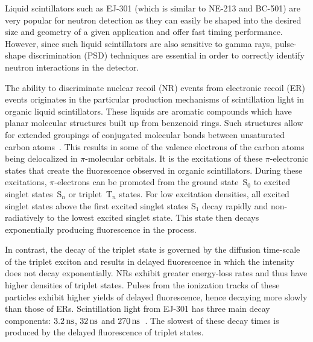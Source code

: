 Liquid scintillators such as EJ-301 (which is similar to NE-213 and BC-501) are very popular for neutron detection as they can easily be shaped into the desired size and geometry of a given application and offer fast timing performance. However, since such liquid scintillators are also sensitive to gamma rays, pulse-shape discrimination (PSD) techniques are essential in order to correctly identify neutron interactions in the detector.

The ability to discriminate nuclear recoil (NR) events from electronic recoil (ER) events originates in the particular production mechanisms of scintillation light in organic liquid scintillators. These liquids are aromatic compounds which have planar molecular structures built up from benzenoid rings. Such structures allow for extended groupings of conjugated molecular bonds between unsaturated carbon atoms~\cite{Brooks:1979}. This results in some of the valence electrons of the carbon atoms being delocalized in $\pi$-molecular orbitals. It is the excitations of these $\pi$-electronic states that create the fluorescence observed in organic scintillators. During these excitations, $\pi$-electrons can be promoted from the ground state~S$_0$ to excited singlet states~S$_n$ or triplet~T$_n$ states. For low excitation densities, all excited singlet states above the first excited singlet states S$_1$ decay rapidly and non-radiatively to the lowest excited singlet state. This state then decays exponentially producing fluorescence in the process.

In contrast, the decay of the triplet state is governed by the diffusion time-scale of the triplet exciton and results in delayed fluorescence in which the intensity does not decay exponentially. NRs exhibit greater energy-loss rates and thus have higher densities of triplet states. Pulses from the ionization tracks of these particles exhibit higher yields of delayed fluorescence, hence decaying more slowly than those of ERs. Scintillation light from EJ-301 has three main decay components: $3.2\,\mathrm{ns}$, $32\,\mathrm{ns}$ and $270\,\mathrm{ns}$~\cite{Kuchnir:1968}. The slowest of these decay times is produced by the delayed fluorescence of triplet states.

